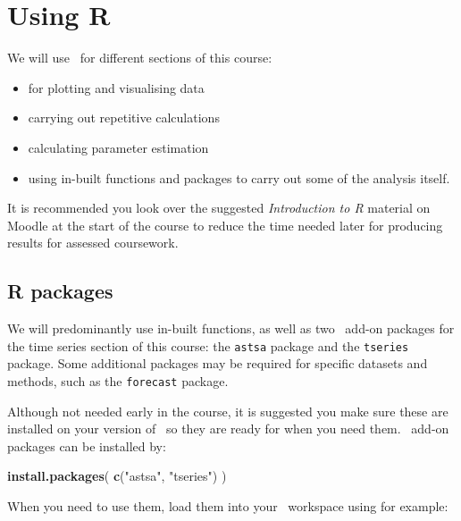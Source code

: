 \documentclass[12pt,a4paper,openany,twoside]{report}
\newenvironment{Shaded}{\begin{snugshade}}{\end{snugshade}}
\newcommand{\KeywordTok}[1]{\textcolor[rgb]{0.13,0.29,0.53}{\textbf{#1}}}
\newcommand{\NormalTok}[1]{#1}
\newcommand{\StringTok}[1]{\textcolor[rgb]{0.31,0.60,0.02}{#1}}
\renewcommand{\emph}[1]{\textcolor{Emerald}{\textit{#1}}}
\theoremstyle{definition}
\theoremstyle{remark}
\theoremstyle{plain}
\newcommand{\vsps}{\vspace{.5cm}}
\newcommand{\sR}[1]{\textbf{R}\,}
\theoremstyle{definition}
\theoremstyle{definition}
\theoremstyle{definition}
\theoremstyle{remark}
\begin{document}
\hypertarget{usingr}{%
\section{Using R}\label{usingr}}

We will use \sR~for different sections of this course:

\begin{itemize}
\item
  for plotting and visualising data
\item
  carrying out repetitive calculations
\item
  calculating parameter estimation
\item
  using in-built functions and packages to carry out some of the analysis itself.
\end{itemize}

It is recommended you look over the suggested \emph{Introduction to R} material on Moodle at the start of the course to reduce the time needed later for producing results for assessed coursework.

\hypertarget{r-packages}{%
\subsection{R packages}\label{r-packages}}

We will predominantly use in-built functions, as well as two \sR~add-on packages for the time series section of this course: the \texttt{astsa} package and the \texttt{tseries} package. Some additional packages may be required for specific datasets and methods, such as the \texttt{forecast} package.

Although not needed early in the course, it is suggested you make sure these are installed on your version of \sR~so they are ready for when you need them. \sR~add-on packages can be installed by:\newline

\begin{Shaded}
\begin{Highlighting}[]
\KeywordTok{install.packages}\NormalTok{( }\KeywordTok{c}\NormalTok{(}\StringTok{"astsa"}\NormalTok{, }\StringTok{"tseries"}\NormalTok{) )}
\end{Highlighting}
\end{Shaded}

\vsps

When you need to use them, load them into your \sR~workspace using for
example: \newline
\end{document}
